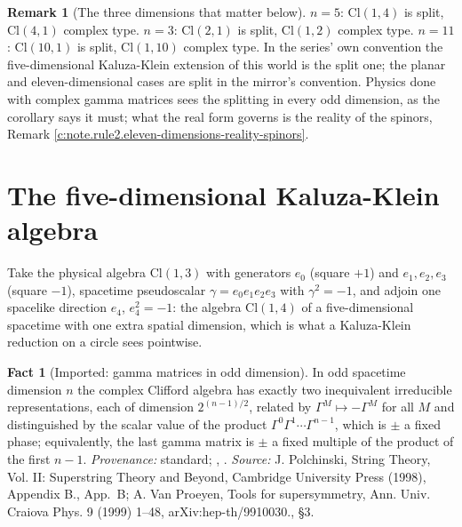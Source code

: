 \documentclass[11pt]{article}
\theoremstyle{definition}
\newtheorem{fact}[theorem]{Fact}
\newtheorem{remark}[theorem]{Remark}
\theoremstyle{plain}
\providecommand{\Cl}{}\renewcommand{\Cl}{\mathrm{Cl}}
\begin{document}
\begin{remark}[The three dimensions that matter below]\label{c:note.rule2.three-dimensions-matter-below}
$n = 5$: $\Cl(1,4)$ is split, $\Cl(4,1)$ complex type. $n = 3$: $\Cl(2,1)$ is split, $\Cl(1,2)$ complex type. $n = 11$: $\Cl(10,1)$ is split, $\Cl(1,10)$ complex type. In the series' own convention the five-dimensional Kaluza-Klein extension of this world is the split one; the planar and eleven-dimensional cases are split in the mirror's convention. Physics done with complex gamma matrices sees the splitting in every odd dimension, as the corollary says it must; what the real form governs is the reality of the spinors, Remark \ref{c:note.rule2.eleven-dimensions-reality-spinors}.
\end{remark}

\section{The five-dimensional Kaluza-Klein algebra}

\label{c:note.rule2.setting-five-dimensional-kaluza-klein-algebra}
Take the physical algebra $\Cl(1,3)$ with generators $e_0$ (square $+1$) and $e_1, e_2, e_3$ (square $-1$), spacetime pseudoscalar $\gamma = e_0e_1e_2e_3$ with $\gamma^2 = -1$, and adjoin one spacelike direction $e_4$, $e_4^2 = -1$: the algebra $\Cl(1,4)$ of a five-dimensional spacetime with one extra spatial dimension, which is what a Kaluza-Klein reduction on a circle sees pointwise.

\begin{fact}[Imported: gamma matrices in odd dimension]\label{c:rule2.imported-gamma-matrices-odd-dimension}
In odd spacetime dimension $n$ the complex Clifford algebra has exactly two inequivalent irreducible representations, each of dimension $2^{(n-1)/2}$, related by $\Gamma^M \mapsto -\Gamma^M$ for all $M$ and distinguished by the scalar value of the product $\Gamma^0\Gamma^1\cdots\Gamma^{n-1}$, which is $\pm$ a fixed phase; equivalently, the last gamma matrix is $\pm$ a fixed multiple of the product of the first $n - 1$. \emph{Provenance:} standard; \cite[App.~B]{Polchinski1998}, \cite[\S 3]{VanProeyen1999}.
\emph{Source:} J. Polchinski, String Theory, Vol. II: Superstring Theory and Beyond, Cambridge University Press (1998), Appendix B., App.~B; A. Van Proeyen, Tools for supersymmetry, Ann. Univ. Craiova Phys. 9 (1999) 1--48, arXiv:hep-th/9910030., \S 3.
\end{fact}
\end{document}
